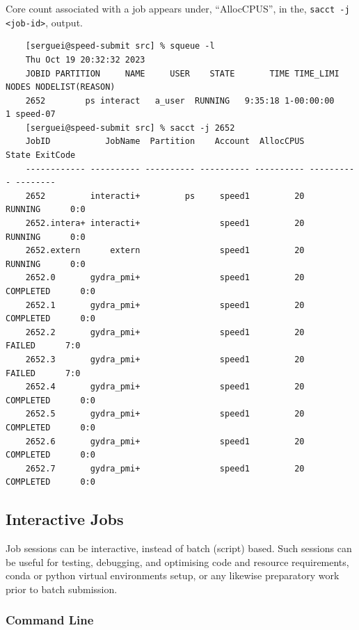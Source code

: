 \noindent Core count associated with a job appears under,
``AllocCPUS'', in the, \texttt{sacct -j <job-id>}, output.

\small
\begin{verbatim}
	[serguei@speed-submit src] % squeue -l
	Thu Oct 19 20:32:32 2023
	JOBID PARTITION     NAME     USER    STATE       TIME TIME_LIMI  NODES NODELIST(REASON)
	2652        ps interact   a_user  RUNNING   9:35:18 1-00:00:00      1 speed-07
	[serguei@speed-submit src] % sacct -j 2652
	JobID           JobName  Partition    Account  AllocCPUS      State ExitCode
	------------ ---------- ---------- ---------- ---------- ---------- --------
	2652         interacti+         ps     speed1         20    RUNNING      0:0
	2652.intera+ interacti+                speed1         20    RUNNING      0:0
	2652.extern      extern                speed1         20    RUNNING      0:0
	2652.0       gydra_pmi+                speed1         20  COMPLETED      0:0
	2652.1       gydra_pmi+                speed1         20  COMPLETED      0:0
	2652.2       gydra_pmi+                speed1         20     FAILED      7:0
	2652.3       gydra_pmi+                speed1         20     FAILED      7:0
	2652.4       gydra_pmi+                speed1         20  COMPLETED      0:0
	2652.5       gydra_pmi+                speed1         20  COMPLETED      0:0
	2652.6       gydra_pmi+                speed1         20  COMPLETED      0:0
	2652.7       gydra_pmi+                speed1         20  COMPLETED      0:0
\end{verbatim}
\normalsize

\subsection{Interactive Jobs}
\label{sect:interactive-jobs}

Job sessions can be interactive, instead of batch (script) based. Such 
sessions can be useful for testing, debugging, and optimising code and resource 
requirements, conda or python virtual environments setup, or any likewise
preparatory work prior to batch submission.

\subsubsection{Command Line}

